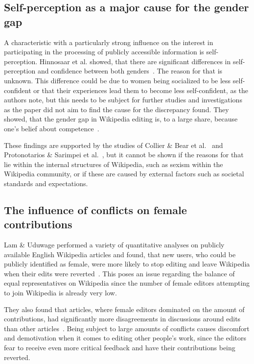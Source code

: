 \documentclass[a4paper, 11pt]{article}
\begin{document}
\subsection{Self-perception as a major cause for the gender gap} \label{sec:gender-gap-wikipedia:self-perception}
A characteristic with a particularly strong influence on the interest in participating in the processing of publicly accessible information is self-perception. Hinnosaar et al. showed, that there are significant differences in self-perception and confidence between both genders~\cite{hinnosaar2019gender}. The reason for that is unknown. This difference could be due to women being socialized to be less self-confident or that their experiences lead them to become less self-confident, as the authors note, but this needs to be subject for further studies and investigations as the paper did not aim to find the cause for the discrepancy found. They showed, that the gender gap in Wikipedia editing is, to a large share, because one’s belief about competence~\cite{hinnosaar2019gender}.

These findings are supported by the studies of Collier \& Bear et al.~\cite{collier2012conflict} and Protonotarios \& Sarimpei et al.~\cite{protonotarios2016similar}, but it cannot be shown if the reasons for that lie within the internal structures of Wikipedia, such as sexism within the Wikipedia community, or if these are caused by external factors such as societal standards and expectations.

\subsection{The influence of conflicts on female contributions} \label{sec:gender-gap-wikipedia:conflicts}
Lam \& Uduwage performed a variety of quantitative analyses on publicly available English Wikipedia articles and found, that new users, who could be publicly identified as female, were more likely to stop editing and leave Wikipedia when their edits were reverted~\cite{lam2011wp}. This poses an issue regarding the balance of equal representatives on Wikipedia since the number of female editors attempting to join Wikipedia is already very low.

They also found that articles, where female editors dominated on the amount of contributions, had significantly more disagreements in discussions around edits than other articles~\cite{lam2011wp}. Being subject to large amounts of conflicts causes discomfort and demotivation when it comes to editing other people’s work, since the editors fear to receive even more critical feedback and have their contributions being reverted.
\end{document}
